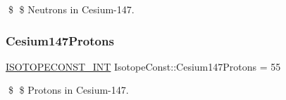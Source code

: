 \$ \$ Neutrons in Cesium-\/147. \mbox{\label{group___isotope_const-_cesium-_cs147_ga363b7089be966faa0757ee5744bb342f}} 
\subsubsection{\texorpdfstring{Cesium147\+Protons}{Cesium147Protons}}
{\footnotesize\ttfamily \mbox{\hyperlink{group___isotope_const-_macros_ga5f18360b3e99483a35c32d789e62621c}{I\+S\+O\+T\+O\+P\+E\+C\+O\+N\+S\+T\+\_\+\+I\+NT}} Isotope\+Const\+::\+Cesium147\+Protons = 55}

\$ \$ Protons in Cesium-\/147. 